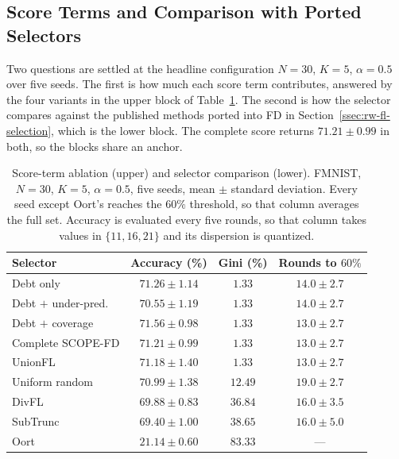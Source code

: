 \documentclass[journal]{IEEEtran}
\newcommand{\rev}[1]{#1}
\begin{document}
\subsection{Score Terms and Comparison with Ported Selectors}
\label{ssec:exp-ablation}

\rev{Two questions are settled at the headline configuration $N=30$, $K=5$, $\alpha=0.5$ over five seeds. The first is how much each score term contributes, answered by the four variants in the upper block of Table~\ref{tab:headline}. The second is how the selector compares against the published methods ported into FD in Section~\ref{ssec:rw-fl-selection}, which is the lower block. The complete score returns $71.21 \pm 0.99$ in both, so the blocks share an anchor.}

\begin{table}[t]
\centering
\caption{\rev{Score-term ablation (upper) and selector comparison (lower). FMNIST, $N=30$, $K=5$, $\alpha=0.5$, five seeds, mean $\pm$ standard deviation. Every seed except Oort's reaches the $60\%$ threshold, so that column averages the full set. Accuracy is evaluated every five rounds, so that column takes values in $\{11,16,21\}$ and its dispersion is quantized.}}
\label{tab:headline}
\renewcommand{\arraystretch}{1.0}
\footnotesize
\setlength{\tabcolsep}{4pt}
\begin{tabular}{@{}lccc@{}}
\toprule
\textbf{Selector} & \textbf{Accuracy (\%)} & \textbf{Gini (\%)} & \textbf{Rounds to $60\%$} \\
\midrule
Debt only              & $71.26 \pm 1.14$ & $1.33$  & $14.0 \pm 2.7$ \\
Debt $+$ under-pred.   & $70.55 \pm 1.19$ & $1.33$  & $14.0 \pm 2.7$ \\
Debt $+$ coverage      & $71.56 \pm 0.98$ & $1.33$  & $13.0 \pm 2.7$ \\
Complete SCOPE-FD      & $71.21 \pm 0.99$ & $1.33$  & $13.0 \pm 2.7$ \\
\midrule
UnionFL \cite{castillo2024unionfl}  & $71.18 \pm 1.40$ & $1.33$  & $13.0 \pm 2.7$ \\
Uniform random      & $70.99 \pm 1.38$ & $12.49$ & $19.0 \pm 2.7$ \\
DivFL \cite{balakrishnan2022divfl}   & $69.88 \pm 0.83$ & $36.84$ & $16.0 \pm 3.5$ \\
SubTrunc \cite{castillo2024subtrunc} & $69.40 \pm 1.00$ & $38.65$ & $16.0 \pm 5.0$ \\
Oort \cite{lai2021oort}              & $21.14 \pm 0.60$ & $83.33$ & --- \\
\bottomrule
\end{tabular}
\end{table}
\end{document}

